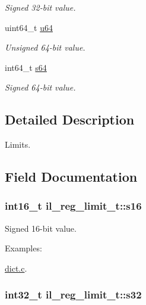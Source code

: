 \begin{DoxyCompactItemize}
\begin{DoxyCompactList}\small\item\em Signed 32-\/bit value. \end{DoxyCompactList}\item 
uint64\+\_\+t \hyperlink{unionil__reg__limit__t_aedc5d365162d7f0cf32035695ae0971b}{u64}
\begin{DoxyCompactList}\small\item\em Unsigned 64-\/bit value. \end{DoxyCompactList}\item 
int64\+\_\+t \hyperlink{unionil__reg__limit__t_afb38fc9250bd41f7da4d61a118941d65}{s64}
\begin{DoxyCompactList}\small\item\em Signed 64-\/bit value. \end{DoxyCompactList}\end{DoxyCompactItemize}


\subsection{Detailed Description}
Limits. 



\subsection{Field Documentation}
\subsubsection[{\texorpdfstring{s16}{s16}}]{\setlength{\rightskip}{0pt plus 5cm}int16\+\_\+t il\+\_\+reg\+\_\+limit\+\_\+t\+::s16}\hypertarget{unionil__reg__limit__t_a92311f25fb2daa832435239274c5cb2a}{}\label{unionil__reg__limit__t_a92311f25fb2daa832435239274c5cb2a}


Signed 16-\/bit value. 

\begin{Desc}
\item[Examples\+: ]\par
\hyperlink{dict_8c-example}{dict.\+c}.\end{Desc}
\subsubsection[{\texorpdfstring{s32}{s32}}]{\setlength{\rightskip}{0pt plus 5cm}int32\+\_\+t il\+\_\+reg\+\_\+limit\+\_\+t\+::s32}\hypertarget{unionil__reg__limit__t_a272eb9cd6948fa6137fdef16e4dc9669}{}\label{unionil__reg__limit__t_a272eb9cd6948fa6137fdef16e4dc9669}


